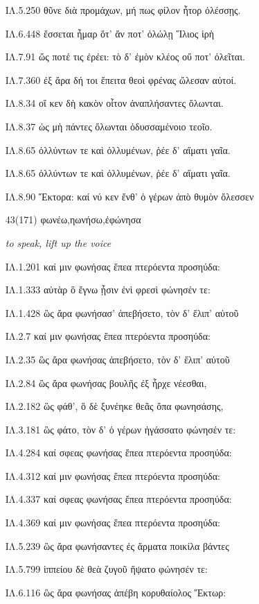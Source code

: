 \begin{enumerate}
{ΙΛ.5.250 θῦνε διὰ προμάχων, μή πως φίλον ἦτορ ὀλέσσῃς.

ΙΛ.6.448 ἔσσεται ἦμαρ ὅτ' ἄν ποτ' ὀλώλῃ Ἴλιος ἱρὴ

ΙΛ.7.91 ὥς ποτέ τις ἐρέει: τὸ δ' ἐμὸν κλέος οὔ ποτ' ὀλεῖται.

ΙΛ.7.360 ἐξ ἄρα δή τοι ἔπειτα θεοὶ φρένας ὤλεσαν αὐτοί.

ΙΛ.8.34 οἵ κεν δὴ κακὸν οἶτον ἀναπλήσαντες ὄλωνται.

ΙΛ.8.37 ὡς μὴ πάντες ὄλωνται ὀδυσσαμένοιο τεοῖο.

ΙΛ.8.65 ὀλλύντων τε καὶ ὀλλυμένων, ῥέε δ' αἵματι γαῖα.

ΙΛ.8.65 ὀλλύντων τε καὶ ὀλλυμένων, ῥέε δ' αἵματι γαῖα.

ΙΛ.8.90 Ἕκτορα: καί νύ κεν ἔνθ' ὁ γέρων ἀπὸ θυμὸν ὄλεσσεν

}


\clearpage
\item[\large 43(171)]{\large \g     φωνέω,ηωνήσω,ἐφώνησα }

\hspace{0.2cm} \textit{ to speak, lift up the voice  }

{\g
ΙΛ.1.201 καί μιν φωνήσας ἔπεα πτερόεντα προσηύδα:

ΙΛ.1.333 αὐτὰρ ὃ ἔγνω ᾗσιν ἐνὶ φρεσὶ φώνησέν τε:

ΙΛ.1.428 ὣς ἄρα φωνήσασ' ἀπεβήσετο, τὸν δ' ἔλιπ' αὐτοῦ

ΙΛ.2.7 καί μιν φωνήσας ἔπεα πτερόεντα προσηύδα:

ΙΛ.2.35 ὣς ἄρα φωνήσας ἀπεβήσετο, τὸν δ' ἔλιπ' αὐτοῦ

ΙΛ.2.84 ὣς ἄρα φωνήσας βουλῆς ἐξ ἦρχε νέεσθαι,

ΙΛ.2.182 ὣς φάθ', ὃ δὲ ξυνέηκε θεᾶς ὄπα φωνησάσης,

ΙΛ.3.181 ὣς φάτο, τὸν δ' ὁ γέρων ἠγάσσατο φώνησέν τε:

ΙΛ.4.284 καί σφεας φωνήσας ἔπεα πτερόεντα προσηύδα:

ΙΛ.4.312 καί μιν φωνήσας ἔπεα πτερόεντα προσηύδα:

ΙΛ.4.337 καί σφεας φωνήσας ἔπεα πτερόεντα προσηύδα:

ΙΛ.4.369 καί μιν φωνήσας ἔπεα πτερόεντα προσηύδα:

ΙΛ.5.239 ὣς ἄρα φωνήσαντες ἐς ἅρματα ποικίλα βάντες

ΙΛ.5.799 ἱππείου δὲ θεὰ ζυγοῦ ἥψατο φώνησέν τε:

ΙΛ.6.116 ὣς ἄρα φωνήσας ἀπέβη κορυθαίολος Ἕκτωρ:

}
\end{enumerate}
